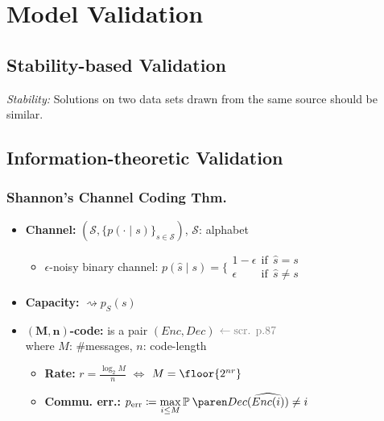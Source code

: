 \columnbreak
\section{Model Validation}

\subsection{Stability-based Validation}

\emph{Stability:}\enspace
Solutions on two data sets drawn from the same source should be similar.


\subsection{Information-theoretic Validation}

\subsubsection{Shannon's Channel Coding Thm.}

\begin{itemize}
    \item \textbf{Channel:}\enspace
        $(\mathcal S, \{p(\cdot\mid s)\}_{s\in\mathcal S} )$,\enspace
        $\mathcal S$: alphabet
        \begin{itemize}
            \item $\epsilon$-noisy binary channel:
                $p(\hat s\mid s) = \big\{ \substack{
                    1-\epsilon \:\:\text{if}\:\: \hat s=s \\
                    \epsilon \phantom{1-} \:\:\text{if}\:\: \hat s\neq s}$
        \end{itemize}
        \vspace{-3pt}
    \item \textbf{Capacity:}\enspace
        $\rightsquigarrow p_S(s)$
    \item \textbf{$\symbf{(M,n)}$-code:}\enspace
        is a pair $(Enc,Dec)$\hfill
        $\color{gray} \leftarrow\text{scr. p.87}$\\\quad
        where $M$: \#messages, $n$: code-length
        \begin{itemize}
            \item \textbf{Rate:}\enspace
                $r = \frac{\log_2 M}{n}$
                $\Leftrightarrow$ $M=\floor{2^{nr}}$
            \item \textbf{Commu. err.:}\enspace
                $p\ped{err} \coloneqq \max\limits_{i\leq M}
                \P{ Dec(\widehat{ Enc(i) }) \neq i }$
        \end{itemize}
\end{itemize}


